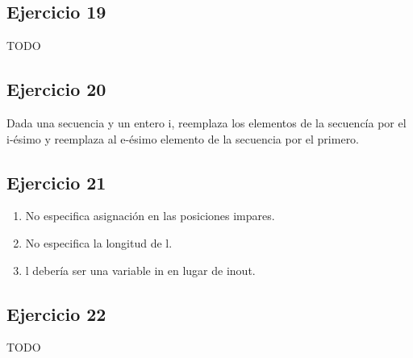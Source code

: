 \subsection{Ejercicio 19}
TODO

\subsection{Ejercicio 20}
Dada una secuencia y un entero i, reemplaza los elementos de la secuencía por el i-ésimo y reemplaza al e-ésimo elemento de la secuencia por el primero.

\subsection{Ejercicio 21}
\begin{enumerate}
    \item No especifica asignación en las posiciones impares.
    \item No especifica la longitud de l.
    \item l debería ser una variable in en lugar de inout.
\end{enumerate}

\subsection{Ejercicio 22}
TODO




